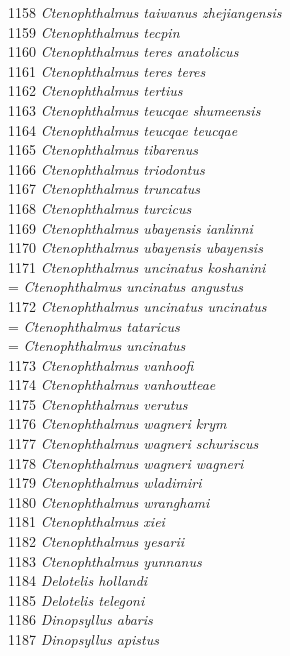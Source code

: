\documentclass[
]{article}
\begin{document}
1158 \emph{Ctenophthalmus taiwanus zhejiangensis}\\
1159 \emph{Ctenophthalmus tecpin}\\
1160 \emph{Ctenophthalmus teres anatolicus}\\
1161 \emph{Ctenophthalmus teres teres}\\
1162 \emph{Ctenophthalmus tertius}\\
1163 \emph{Ctenophthalmus teucqae shumeensis}\\
1164 \emph{Ctenophthalmus teucqae teucqae}\\
1165 \emph{Ctenophthalmus tibarenus}\\
1166 \emph{Ctenophthalmus triodontus}\\
1167 \emph{Ctenophthalmus truncatus}\\
1168 \emph{Ctenophthalmus turcicus}\\
1169 \emph{Ctenophthalmus ubayensis ianlinni}\\
1170 \emph{Ctenophthalmus ubayensis ubayensis}\\
1171 \emph{Ctenophthalmus uncinatus koshanini}\\
= \emph{Ctenophthalmus uncinatus angustus}\\
1172 \emph{Ctenophthalmus uncinatus uncinatus}\\
= \emph{Ctenophthalmus tataricus}\\
= \emph{Ctenophthalmus uncinatus}\\
1173 \emph{Ctenophthalmus vanhoofi}\\
1174 \emph{Ctenophthalmus vanhoutteae}\\
1175 \emph{Ctenophthalmus verutus}\\
1176 \emph{Ctenophthalmus wagneri krym}\\
1177 \emph{Ctenophthalmus wagneri schuriscus}\\
1178 \emph{Ctenophthalmus wagneri wagneri}\\
1179 \emph{Ctenophthalmus wladimiri}\\
1180 \emph{Ctenophthalmus wranghami}\\
1181 \emph{Ctenophthalmus xiei}\\
1182 \emph{Ctenophthalmus yesarii}\\
1183 \emph{Ctenophthalmus yunnanus}\\
1184 \emph{Delotelis hollandi}\\
1185 \emph{Delotelis telegoni}\\
1186 \emph{Dinopsyllus abaris}\\
1187 \emph{Dinopsyllus apistus}\\
\end{document}
